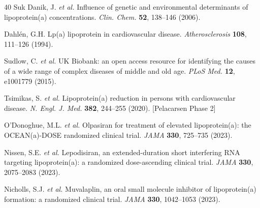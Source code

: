 \documentclass[11pt,a4paper]{article}
\begin{document}
\begin{thebibliography}{40}
 Suk Danik, J. \textit{et al.} Influence of genetic and environmental determinants of lipoprotein(a) concentrations. \textit{Clin. Chem.} \textbf{52}, 138--146 (2006).

 Dahl{\'e}n, G.H. Lp(a) lipoprotein in cardiovascular disease. \textit{Atherosclerosis} \textbf{108}, 111--126 (1994).

 Sudlow, C. \textit{et al.} UK Biobank: an open access resource for identifying the causes of a wide range of complex diseases of middle and old age. \textit{PLoS Med.} \textbf{12}, e1001779 (2015).

 Tsimikas, S. \textit{et al.} Lipoprotein(a) reduction in persons with cardiovascular disease. \textit{N. Engl. J. Med.} \textbf{382}, 244--255 (2020). [Pelacarsen Phase 2]

 O'Donoghue, M.L. \textit{et al.} Olpasiran for treatment of elevated lipoprotein(a): the OCEAN(a)-DOSE randomized clinical trial. \textit{JAMA} \textbf{330}, 725--735 (2023).

 Nissen, S.E. \textit{et al.} Lepodisiran, an extended-duration short interfering RNA targeting lipoprotein(a): a randomized dose-ascending clinical trial. \textit{JAMA} \textbf{330}, 2075--2083 (2023).

 Nicholls, S.J. \textit{et al.} Muvalaplin, an oral small molecule inhibitor of lipoprotein(a) formation: a randomized clinical trial. \textit{JAMA} \textbf{330}, 1042--1053 (2023).

\end{thebibliography}
\end{document}
